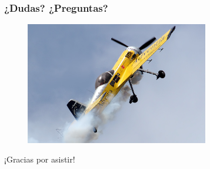 \documentclass[18pt]{beamer}
\begin{document}
\begin{frame}

	\frametitle{¿Dudas? ¿Preguntas?}
	
	\begin{figure}
		\includegraphics[width=8cm]{images/Sukhoi_Su-31_Ramon_Alonso_EC-HGL.jpg}
	\end{figure}

	\begin{center}
		\Large ¡Gracias por asistir!
	\end{center}
	
\end{frame}

	
\end{document}
